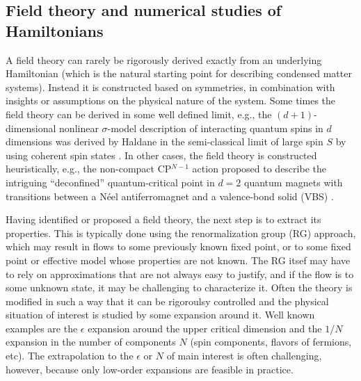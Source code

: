 \documentclass[range]{ar2e}
\begin{document}
\subsection{Field theory and numerical studies of Hamiltonians}

A field theory can rarely be rigorously derived exactly from 
an underlying Hamiltonian (which is the natural starting point for describing condensed matter systems). Instead
it is constructed based on symmetries, in combination with insights or assumptions on the physical nature of the
system. Some times the field theory can be derived in some well defined limit, e.g., the $(d+1)$-dimensional
nonlinear $\sigma$-model description of interacting quantum spins in $d$ dimensions was derived by Haldane in 
the semi-classical limit of large spin $S$ by using coherent spin states \cite{Haldane83,Chakravarty89,Auerbach94}. 
In other cases, the field theory is constructed heuristically, e.g., the non-compact CP$^{N-1}$ action
proposed to describe the intriguing ``deconfined'' quantum-critical point in $d=2$ quantum magnets with 
transitions between a N\'eel antiferromagnet and a valence-bond solid (VBS) \cite{Senthil04a,Sachdev08}.


Having identified or proposed a field
theory, the next step is to extract its properties. This is typically done using the renormalization group (RG)
approach, which may result in flows to some previously known fixed point, or to some fixed point or effective
model whose properties are not known. The RG itsef may have to rely on approximations that are not always easy
to justify, and if the flow is to some unknown state, it may be challenging to characterize it. Often the theory
is modified in such a way that it can be rigoroulsy controlled and the physical situation of interest is studied 
by some expansion around it. Well known examples are the $\epsilon$ expansion around the upper critical dimension 
and the $1/N$ expansion in the number of components $N$ (spin components, flavors of fermions, etc). The
extrapolation to the $\epsilon$ or $N$ of main interest is often challenging, however, because only low-order
expansions are feasible in practice.
\end{document}
